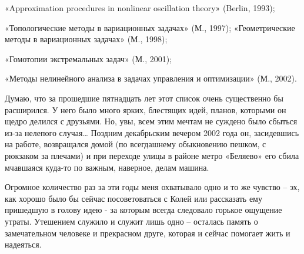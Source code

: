 «Approximation procedures in nonlinear oscillation theory» (Berlin, 1993); 
 
«Топологические методы в вариационных задачах» (М., 1997); «Геометрические методы в вариационных задачах» (М., 1998);

«Гомотопии экстремальных задач» (М., 2001);

«Методы нелинейного анализа в задачах управления и оптимизации» (М., 2002).

	Думаю, что за прошедшие пятнадцать лет этот список очень существенно бы расширился. У него было много ярких, блестящих идей, планов, которыми он щедро делился с друзьями. Но, увы, всем  этим мечтам не суждено было сбыться из-за нелепого случая… Поздним декабрьским вечером 2002 года он, засидевшись на работе, возвращался домой (по всегдашнему обыкновению пешком, с рюкзаком за плечами) и при переходе улицы в районе метро «Беляево» его сбила мчавшаяся куда-то по важным, наверное, делам машина.
	
Огромное количество раз за эти годы меня охватывало одно и то же чувство – эх, как хорошо было бы сейчас посоветоваться с Колей или рассказать ему пришедшую в голову идею - за которым всегда следовало горькое ощущение утраты. Утешением служило и служит лишь одно – осталась память о замечательном человеке и прекрасном друге, которая и сейчас помогает жить и надеяться.
